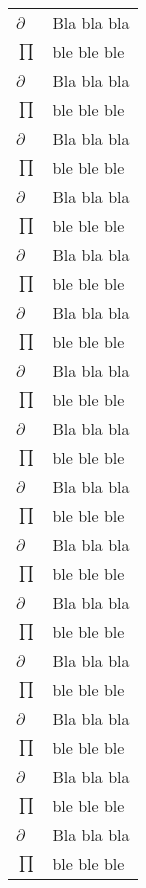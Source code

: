 \begin{thesissymbols}
\begin{footnotesize}
\begin{longtable}[l]{p{2cm}l}
  $\partial$   \dotfill  & Bla bla bla \\
  $\prod$       \dotfill & ble ble ble \\
  $\partial$   \dotfill  & Bla bla bla \\
  $\prod$       \dotfill & ble ble ble \\
  $\partial$   \dotfill  & Bla bla bla \\
  $\prod$       \dotfill & ble ble ble \\
  $\partial$   \dotfill  & Bla bla bla \\
  $\prod$       \dotfill & ble ble ble \\
  $\partial$   \dotfill  & Bla bla bla \\
  $\prod$       \dotfill & ble ble ble \\
  $\partial$   \dotfill  & Bla bla bla \\
  $\prod$       \dotfill & ble ble ble \\
  $\partial$   \dotfill  & Bla bla bla \\
  $\prod$       \dotfill & ble ble ble \\
  $\partial$   \dotfill  & Bla bla bla \\
  $\prod$       \dotfill & ble ble ble \\
  $\partial$   \dotfill  & Bla bla bla \\
  $\prod$       \dotfill & ble ble ble \\
  $\partial$   \dotfill  & Bla bla bla \\
  $\prod$       \dotfill & ble ble ble \\
  $\partial$   \dotfill  & Bla bla bla \\
  $\prod$       \dotfill & ble ble ble \\
  $\partial$   \dotfill  & Bla bla bla \\
  $\prod$       \dotfill & ble ble ble \\
  $\partial$   \dotfill  & Bla bla bla \\
  $\prod$       \dotfill & ble ble ble \\
  $\partial$   \dotfill  & Bla bla bla \\
  $\prod$       \dotfill & ble ble ble \\
  $\partial$   \dotfill  & Bla bla bla \\
  $\prod$       \dotfill & ble ble ble \\

\end{longtable}
\end{footnotesize}
\end{thesissymbols}
